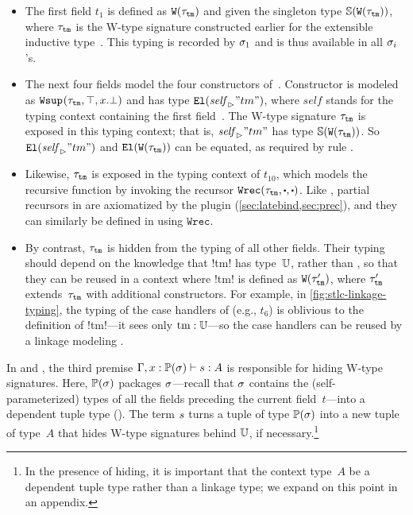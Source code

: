 \begin{itemize}
  [labelsep=*,leftmargin=1pc,itemsep=3pt]

\item 
The first field $t_1$ is defined as $\texttt{W}({\tau_{\texttt{tm}}})$
and given the singleton type $\mathbb{S}({\texttt{W}({\tau_{\texttt{tm}}})})$, where $\tau_{\texttt{tm}}$
is the W-type signature constructed earlier for the extensible inductive type~.
This typing is recorded by $\sigma_1$ and is thus available in all $\sigma_i$'s.

\item 
The next four fields model the four constructors of~.
Constructor  is modeled as $\texttt{Wsup}_{}({\tau_{\texttt{tm}}},{\top},{x.\bot})$
and has type $\texttt{El}({{\mathit{self}}_{\rhd}{"tm"}})$, where $\mathit{self}$ stands for
the typing context containing the first field~.
The W-type signature $\tau_{\texttt{tm}}$ is exposed in
this typing context; that is, ${\mathit{self}}_{\rhd}{"tm"}$ has type $\mathbb{S}({\texttt{W}({\tau_{\texttt{tm}}})})$.
So $\texttt{El}({{\mathit{self}}_{\rhd}{"tm"}})$ and $\texttt{El}({\texttt{W}({\tau_{\texttt{tm}}})})$ can be equated,
as required by rule .

\item
Likewise, $\tau_{\texttt{tm}}$ is exposed in the typing context of
$t_{10}$, which models the recursive function  by invoking
the recursor $\Wrec{\wsig_{\texttt{tm}}}{\cDot}{\cDot}$.
%
Like , partial recursors in \Lang are axiomatized by the plugin
(\cref{sec:latebind,sec:prec}), and they can similarly be defined in \TT
using $\texttt{Wrec}$.

\item
By contrast, $\tau_{\texttt{tm}}$ is hidden from the typing of all other fields.
Their typing should depend on the knowledge that \lsti!tm! has type~$\mathbb{U}$,
rather than ,
so that they can be reused in a context where
\lsti!tm! is defined as $\texttt{W}({\tau'_{\texttt{tm}}})$,
where $\tau'_{\texttt{tm}}$ extends~$\tau_{\texttt{tm}}$ with additional constructors.
%
For example, in \cref{fig:stlc-linkage-typing}, the typing of the case handlers of
 (e.g., $t_6$) is oblivious to the definition of \lsti!tm!---it sees only $\text{\lsti!tm!}:\cU$---so
the case handlers can be reused by a linkage modeling .

\end{itemize}

In  and ,
the third premise $ {\Gamma,x : \mathbb{P}({\sigma})} \vdash {\ensuremath{s}} : {A} $ is
responsible for hiding W-type signatures.
Here, $\mathbb{P}({\sigma})$ packages $\sigma$---recall that $\sigma$ contains the
(self-parameterized) types of all the fields preceding the current
field~$t$---into a dependent tuple type ().
The term $s$ turns a tuple of type $\mathbb{P}({\sigma})$ into a new tuple of type~$A$
that hides W-type signatures behind $\mathbb{U}$, if necessary.\footnote{%
In the presence of hiding, it is important that the context type~$A$ be a
dependent tuple type rather than a linkage type; we expand on this point in an
appendix.}

